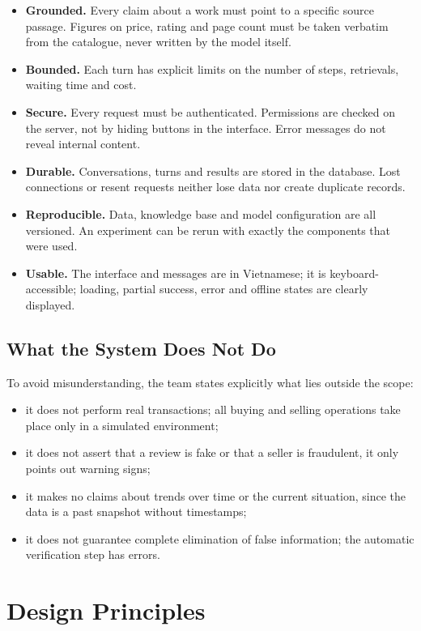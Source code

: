 \begin{itemize}
    \item \textbf{Grounded.} Every claim about a work must point to a specific source passage. Figures on price, rating and page count must be taken verbatim from the catalogue, never written by the model itself.
    \item \textbf{Bounded.} Each turn has explicit limits on the number of steps, retrievals, waiting time and cost.
    \item \textbf{Secure.} Every request must be authenticated. Permissions are checked on the server, not by hiding buttons in the interface. Error messages do not reveal internal content.
    \item \textbf{Durable.} Conversations, turns and results are stored in the database. Lost connections or resent requests neither lose data nor create duplicate records.
    \item \textbf{Reproducible.} Data, knowledge base and model configuration are all versioned. An experiment can be rerun with exactly the components that were used.
    \item \textbf{Usable.} The interface and messages are in Vietnamese; it is keyboard-accessible; loading, partial success, error and offline states are clearly displayed.
\end{itemize}

\subsection{What the System Does Not Do}

To avoid misunderstanding, the team states explicitly what lies outside the scope:

\begin{itemize}
    \item it does not perform real transactions; all buying and selling operations take place only in a simulated environment;
    \item it does not assert that a review is fake or that a seller is fraudulent, it only points out warning signs;
    \item it makes no claims about trends over time or the current situation, since the data is a past snapshot without timestamps;
    \item it does not guarantee complete elimination of false information; the automatic verification step has errors.
\end{itemize}

\section{Design Principles}


